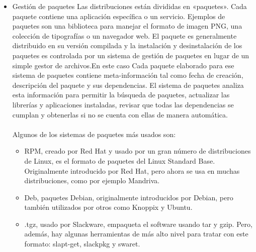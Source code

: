 \begin{itemize}
\item Gestión de paquetes
	  Las distribuciones están divididas en «paquetes». Cada paquete contiene una aplicación específica o un servicio. 			  Ejemplos de paquetes son una biblioteca para manejar el formato de imagen PNG, una colección de tipografías o un 			  navegador web.
	  El paquete es generalmente distribuido en su versión compilada y la instalación y desinstalación de los paquetes es 		  controlada por un sistema de gestión de paquetes en lugar de un simple gestor de archivos.En este caso Cada paquete 		  elaborado para ese sistema de paquetes contiene meta-información tal como fecha de creación, descripción del paquete 	  y sus dependencias. El sistema de paquetes analiza esta información para permitir la búsqueda de paquetes, 				  actualizar las librerías y aplicaciones instaladas, revisar que todas las dependencias se cumplan y obtenerlas si no 	  se cuenta con ellas de manera automática.	
	  \\
	  \\
	  Algunos de los sistemas de paquetes más usados son:
	  \begin{itemize}
	  \item RPM, creado por Red Hat y usado por un gran número de distribuciones de Linux, es el formato de paquetes del 		   Linux Standard Base. Originalmente introducido por Red Hat, pero ahora se usa en muchas distribuciones, como por 		   ejemplo Mandriva.
	  \item Deb, paquetes Debian, originalmente introducidos por Debian, pero también utilizados por otros como Knoppix y 		   Ubuntu.
	  \item .tgz, usado por Slackware, empaqueta el software usando tar y gzip. Pero, además, hay algunas herramientas de 		   más alto nivel para tratar con este formato: slapt-get, slackpkg y swaret.
	  \end{itemize}	  
\end{itemize}

